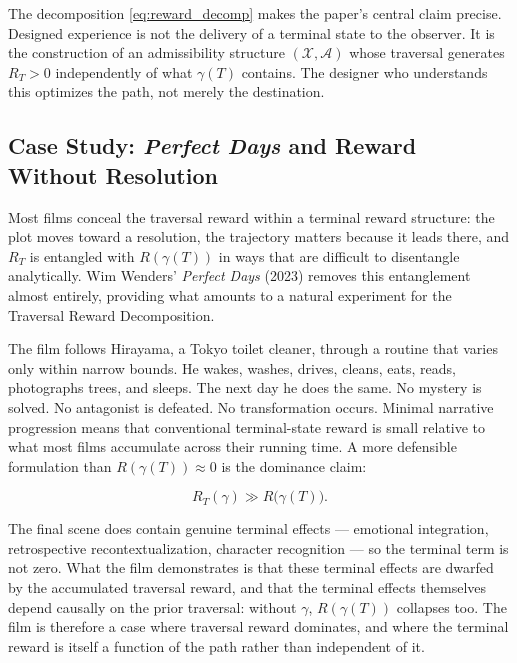 \documentclass[12pt, a4paper]{article}
\theoremstyle{plain}
\theoremstyle{definition}
\theoremstyle{remark}
\newcommand{\X}{\mathcal{X}}
\newcommand{\A}{\mathcal{A}}
\newcommand{\traj}{\gamma}
\newcommand{\reward}{R}
\begin{document}
The decomposition \eqref{eq:reward_decomp} makes the
paper's central claim precise. Designed experience is not
the delivery of a terminal state to the observer. It is
the construction of an admissibility structure $(\X, \A)$
whose traversal generates $\reward_T > 0$ independently
of what $\traj(T)$ contains. The designer who understands
this optimizes the path, not merely the destination.

\subsection{Case Study: \textit{Perfect Days} and Reward
Without Resolution}
\label{subsec:perfect_days}

Most films conceal the traversal reward within a terminal
reward structure: the plot moves toward a resolution, the
trajectory matters because it leads there, and $\reward_T$
is entangled with $\reward(\traj(T))$ in ways that are
difficult to disentangle analytically. Wim Wenders'
\textit{Perfect Days} \cite{wenders2023} (2023) removes this entanglement
almost entirely, providing what amounts to a natural
experiment for the Traversal Reward Decomposition.

The film follows Hirayama, a Tokyo toilet cleaner, through
a routine that varies only within narrow bounds. He wakes,
washes, drives, cleans, eats, reads, photographs trees, and
sleeps. The next day he does the same. No mystery is solved.
No antagonist is defeated. No transformation occurs. Minimal
narrative progression means that conventional terminal-state
reward is small relative to what most films accumulate
across their running time. A more defensible formulation
than $\reward(\traj(T)) \approx 0$ is the dominance claim:

\begin{equation}
  \reward_T(\traj) \gg \reward\bigl(\traj(T)\bigr).
\end{equation}

The final scene does contain genuine terminal effects ---
emotional integration, retrospective recontextualization,
character recognition --- so the terminal term is not zero.
What the film demonstrates is that these terminal effects
are dwarfed by the accumulated traversal reward, and that
the terminal effects themselves depend causally on the
prior traversal: without $\traj$, $\reward(\traj(T))$
collapses too. The film is therefore a case where traversal
reward dominates, and where the terminal reward is itself
a function of the path rather than independent of it.
\end{document}
